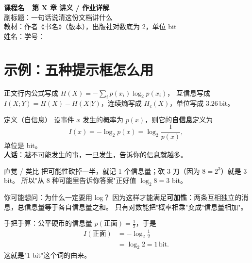 \documentclass[11pt,a4paper,fontset=none]{ctexart}
\newcommand{\Hx}[1]{H\!\left(#1\right)}       %
\newcommand{\Hc}[1]{H_{c}\!\left(#1\right)}   %
\newcommand{\I}[1]{I\!\left(#1\right)}        %
\newcommand{\lb}{\log_{2}}                    %
\newcommand{\bit}{\,\text{bit}}               %
\begin{document}
\begin{center}
  {\LARGE\bfseries 课程名\ \ 第 X 章 讲义 / 作业详解}\\[6pt]
  {\large 副标题：一句话说清这份文档讲什么}\\[8pt]
  {\small 教材：作者《书名》（版本），出版社\qquad 对数底为 2，单位 bit}\\[4pt]
  {\small 姓名：\underline{\hspace{3cm}}\quad 学号：\underline{\hspace{3cm}}}
\end{center}

\tableofcontents        %
\newpage

\section{示例：五种提示框怎么用}

正文行内公式写成 $\Hx{X}=-\sum_i p(x_i)\lb p(x_i)$，
互信息写成 $\I{X;Y}=\Hx{X}-\Hx{X|Y}$，连续熵写成 $\Hc{X}$，单位写成 $3.26\bit$。

\begin{defbox}{定义（自信息）}
设事件 $x$ 发生的概率为 $p(x)$，则它的\textbf{自信息}定义为
\[
I(x)=-\lb p(x)=\lb\frac{1}{p(x)},
\]
单位是 bit。\\
\textbf{人话}：越不可能发生的事，一旦发生，告诉你的信息就越多。
\end{defbox}

\begin{idea}{直觉 / 类比}
把可能性砍掉一半，就记 1 个信息量；砍 3 刀（因为 $8=2^3$）就是 3 bit。
所以"从 8 种可能里告诉你答案"正好值 $\lb 8=3$ bit。
\end{idea}

\begin{qa}{你可能想问：为什么一定要用 log？}
因为这样才能满足\textbf{可加性}：两条互相独立的消息，总信息量等于各自信息量之和。
只有对数能把"概率相乘"变成"信息量相加"。
\end{qa}

\begin{calc}{手把手算：公平硬币的信息量}
$p(\text{正面})=\tfrac12$，于是
\begin{align*}
I(\text{正面})&=-\lb\frac12\\
&=\lb 2=1\bit .
\end{align*}
这就是"1 bit"这个词的由来。
\end{calc}
\end{document}
